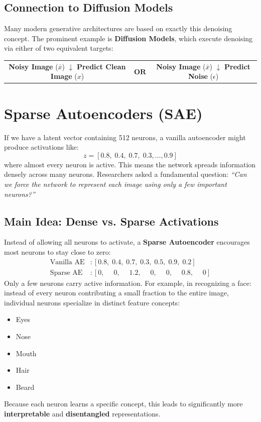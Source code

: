 \subsection*{Connection to Diffusion Models}
Many modern generative architectures are based on exactly this denoising concept. The prominent example is \textbf{Diffusion Models}, which execute denoising via either of two equivalent targets:
\begin{center}
\begin{tabular}{ccc}
\fbox{\parbox{0.38\linewidth}{\centering \textbf{Noisy Image } ($\bar{x}$)\\[2pt]$\downarrow$\\[2pt]\textbf{Predict Clean Image } ($x$)}} & \quad $\mathbf{OR}$ \quad & \fbox{\parbox{0.38\linewidth}{\centering \textbf{Noisy Image } ($\bar{x}$)\\[2pt]$\downarrow$\\[2pt]\textbf{Predict Noise } ($\epsilon$)}}
\end{tabular}
\end{center}

\section{Sparse Autoencoders (SAE)}

If we have a latent vector containing 512 neurons, a vanilla autoencoder might produce activations like:
\[
z = [0.8, \; 0.4, \; 0.7, \; 0.3, \dots, 0.9]
\]
where almost every neuron is active. This means the network spreads information densely across many neurons. Researchers asked a fundamental question: \emph{``Can we force the network to represent each image using only a few important neurons?''}

\subsection*{Main Idea: Dense vs. Sparse Activations}
Instead of allowing all neurons to activate, a \textbf{Sparse Autoencoder} encourages most neurons to stay close to zero:
\begin{align*}
\text{Vanilla AE} &: [0.8, \; 0.4, \; 0.7, \; 0.3, \; 0.5, \; 0.9, \; 0.2] \\
\text{Sparse AE}  &: [0, \;\quad 0, \;\quad 1.2, \;\quad 0, \;\quad 0, \;\quad 0.8, \;\quad 0]
\end{align*}
Only a few neurons carry active information. For example, in recognizing a face: instead of every neuron contributing a small fraction to the entire image, individual neurons specialize in distinct feature concepts:
\begin{itemize}
    \item Eyes
    \item Nose
    \item Mouth
    \item Hair
    \item Beard
\end{itemize}
Because each neuron learns a specific concept, this leads to significantly more \textbf{interpretable} and \textbf{disentangled} representations.

